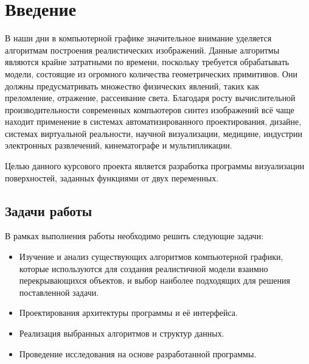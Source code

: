 \chapter*{Введение}

В наши дни в компьютерной графике значительное внимание уделяется алгоритмам построения реалистических изображений.
Данные алгоритмы являются крайне затратными по времени, поскольку требуется обрабатывать модели, состоящие из огромного количества геометрических примитивов.
Они должны предусматривать множество физических явлений, таких как преломление, отражение, рассеивание света.
Благодаря росту вычислительной производительности современных компьютеров синтез изображений всё чаще находит применение в системах автоматизированного проектирования, дизайне, системах виртуальной реальности, научной визуализации, медицине, индустрии электронных развлечений, кинематографе и мультипликации.

Целью данного курсового проекта является разработка программы визуализации поверхностей, заданных функциями от двух переменных.

\section*{Задачи работы}

В рамках выполнения работы необходимо решить следующие задачи:
\begin{itemize}
	\item Изучение и анализ существующих алгоритмов компьютерной графики, которые используются для создания реалистичной модели взаимно перекрывающихся объектов, и выбор наиболее подходящих для решения поставленной задачи.
	\item Проектирования архитектуры программы и её интерфейса.
	\item Реализация выбранных алгоритмов и структур данных.
	\item Проведение исследования на основе разработанной программы.
\end{itemize}
